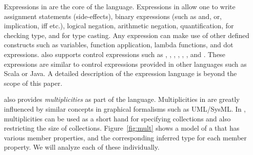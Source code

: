 Expressions in \Klang{} are the core of the language. Expressions in
\Klang{} allow one to write assignment statements (side-effects),
binary expressions (such as and, or, implication, iff etc.), logical
negation, arithmetic negation, quantification,  for checking
type, and  for type casting. Any expression can make use of
other defined constructs such as variables, function application,
lambda functions, and dot expressions. \Klang{} also supports control
expressions such as , , ,
, , , and . These
expressions are similar to control expressions provided in other
languages such as Scala or Java. A detailed description of the
expression language is beyond the scope of this paper.

\Klang{} also provides {\em multiplicities} as part of the
language. Multiplicities in \Klang{} are greatly influenced by similar
concepts in graphical formalisms such as UML/SysML. In \Klang{},
multiplicities can be used as a short hand for specifying collections
and also restricting the size of collections. Figure~\ref{fig:mult}
shows a \Klang{} model of a  that has various member
properties, and the corresponding inferred type for each member
property. We will analyze each of these individually.


